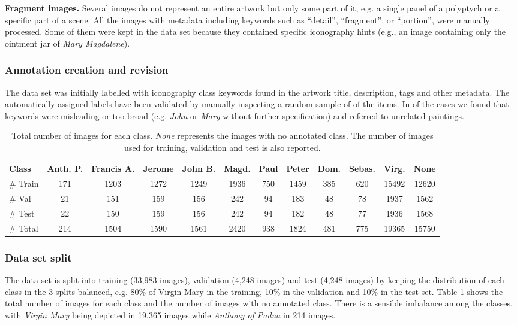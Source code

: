 \documentclass[acmlarge]{acmart}
\newcommand{\quoted}[1]{``#1''}
\begin{document}
\textbf{Fragment images.} Several  images do not represent an entire artwork but only some part of it, e.g. a single panel of a polyptych or a specific part of a scene. All the images with metadata  including  keywords  such as \quoted{detail}, \quoted{fragment}, or \quoted{portion}, were manually processed. Some of them were kept in the data set because they contained specific iconography hints  (e.g., an image containing only the ointment jar of \textit{Mary Magdalene}).

\subsubsection{Annotation creation and revision}

The data set was initially labelled with iconography class keywords found in the artwork title, description, tags and other metadata. The automatically assigned labels have been validated by manually inspecting a random sample of  of the items. In   of the cases we found that  keywords were misleading or too broad (e.g. \textit{John} or \textit{Mary} without further specification) and referred to unrelated paintings. 

\begin{table}[t]
\centering
\begin{tabularx}{\linewidth}{|X|c|c|c|c|c|c|c|c|c|c|c|}
\hline
Class & Anth. P. & Francis A. & Jerome & John B. & Magd. & Paul & Peter & Dom. & Sebas. & Virg. & None \\ \hline
\# Train & 171 & 1203 & 1272 & 1249 & 1936 & 750 & 1459 & 385 & 620 & 15492 & 12620\\ \hline
\# Val & 21 & 151 & 159 & 156 & 242 & 94 & 183 & 48 & 78 & 1937 & 1562\\ \hline
\# Test & 22 & 150 & 159 & 156 & 242 & 94 & 182 & 48 & 77 & 1936 & 1568\\ \hline
\# Total & 214 & 1504 & 1590 & 1561 & 2420 & 938 & 1824 & 481 & 775 & 19365 & 15750 \\ \hline
\end{tabularx}\caption{Total number of images for each class. \textit{None} represents the images with no annotated class. The number of images used for training, validation and test is also reported.}
\label{tab:nsaints_table}
\end{table}


\subsubsection{Data set split}
The data set is split into training (33,983 images), validation (4,248 images) and test (4,248 images) by keeping  the distribution of each class in the 3 splits balanced, e.g. 80\% of Virgin Mary in the training, 10\% in the validation and 10\% in the test set. Table \ref{tab:nsaints_table} shows the total number of images for each class and the number of images with no annotated class. There is a sensible imbalance among the classes, with \textit{Virgin Mary} being depicted in 19,365 images while \textit{Anthony of Padua} in 214 images.  
\end{document}

